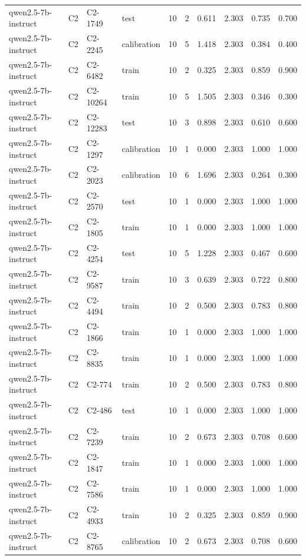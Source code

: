 \begin{table}
\begin{tabular}{llllrrrrrr}
qwen2.5-7b-instruct & C2 & C2-1749 & test & 10 & 2 & 0.611 & 2.303 & 0.735 & 0.700 \\
qwen2.5-7b-instruct & C2 & C2-2245 & calibration & 10 & 5 & 1.418 & 2.303 & 0.384 & 0.400 \\
qwen2.5-7b-instruct & C2 & C2-6482 & train & 10 & 2 & 0.325 & 2.303 & 0.859 & 0.900 \\
qwen2.5-7b-instruct & C2 & C2-10264 & train & 10 & 5 & 1.505 & 2.303 & 0.346 & 0.300 \\
qwen2.5-7b-instruct & C2 & C2-12283 & test & 10 & 3 & 0.898 & 2.303 & 0.610 & 0.600 \\
qwen2.5-7b-instruct & C2 & C2-1297 & calibration & 10 & 1 & 0.000 & 2.303 & 1.000 & 1.000 \\
qwen2.5-7b-instruct & C2 & C2-2023 & calibration & 10 & 6 & 1.696 & 2.303 & 0.264 & 0.300 \\
qwen2.5-7b-instruct & C2 & C2-2570 & test & 10 & 1 & 0.000 & 2.303 & 1.000 & 1.000 \\
qwen2.5-7b-instruct & C2 & C2-1805 & train & 10 & 1 & 0.000 & 2.303 & 1.000 & 1.000 \\
qwen2.5-7b-instruct & C2 & C2-4254 & test & 10 & 5 & 1.228 & 2.303 & 0.467 & 0.600 \\
qwen2.5-7b-instruct & C2 & C2-9587 & train & 10 & 3 & 0.639 & 2.303 & 0.722 & 0.800 \\
qwen2.5-7b-instruct & C2 & C2-4494 & train & 10 & 2 & 0.500 & 2.303 & 0.783 & 0.800 \\
qwen2.5-7b-instruct & C2 & C2-1866 & train & 10 & 1 & 0.000 & 2.303 & 1.000 & 1.000 \\
qwen2.5-7b-instruct & C2 & C2-8835 & train & 10 & 1 & 0.000 & 2.303 & 1.000 & 1.000 \\
qwen2.5-7b-instruct & C2 & C2-774 & train & 10 & 2 & 0.500 & 2.303 & 0.783 & 0.800 \\
qwen2.5-7b-instruct & C2 & C2-486 & test & 10 & 1 & 0.000 & 2.303 & 1.000 & 1.000 \\
qwen2.5-7b-instruct & C2 & C2-7239 & train & 10 & 2 & 0.673 & 2.303 & 0.708 & 0.600 \\
qwen2.5-7b-instruct & C2 & C2-1847 & train & 10 & 1 & 0.000 & 2.303 & 1.000 & 1.000 \\
qwen2.5-7b-instruct & C2 & C2-7586 & train & 10 & 1 & 0.000 & 2.303 & 1.000 & 1.000 \\
qwen2.5-7b-instruct & C2 & C2-4933 & train & 10 & 2 & 0.325 & 2.303 & 0.859 & 0.900 \\
qwen2.5-7b-instruct & C2 & C2-8765 & calibration & 10 & 2 & 0.673 & 2.303 & 0.708 & 0.600 \\

\end{tabular}
\end{table}
